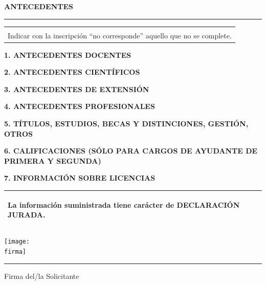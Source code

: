 \documentclass{article}
\newcommand{\titulosec}[1]{\textbf{\textsf{\MakeUppercase{#1}}}}
\newcommand{\seccion}[1]{
    \bigskip
    \noindent \titulosec{#1} \\
    \noindent\rule{\textwidth}{1pt}
  }
\newcommand{\recuadro}[1]{
    \begin{center}
    \begin{tabular}{|m{0.9\textwidth}|}
        \hline
        \begin{center}
        \textsf{\textbf{#1}}
        \end{center}
        \\
        \hline
    \end{tabular}
    \end{center}
  }
\begin{document}
  \seccion{Antecedentes}

  \recuadro{En todos los casos ordenar los antecedentes cronológicamente, poniendo primero los más recientes.\\Indicar con la inscripción “no corresponde” aquello que no se complete.}

  \noindent \titulosec{1. Antecedentes docentes}

  

  \noindent \titulosec{2. Antecedentes científicos}

  

  \noindent \titulosec{3. Antecedentes de extensión}

  

  \noindent \titulosec{4. Antecedentes profesionales}

  

  \noindent \titulosec{5. Títulos, estudios, becas y distinciones, gestión, otros}

  

  \noindent \titulosec{6. Calificaciones (sólo para cargos de Ayudante de Primera y Segunda)}

  

  \noindent \titulosec{7. Información sobre licencias}

  \licencias

  \recuadro{La información suministrada tiene carácter de DECLARACIÓN JURADA.}

  \vspace{100pt}

  \begin{center}
  \ifdefined\firma \texttt{[image: \\firma]}\fi

  \noindent\rule{5cm}{1pt}

  Firma del/la Solicitante
  \end{center}

  
\end{document}
